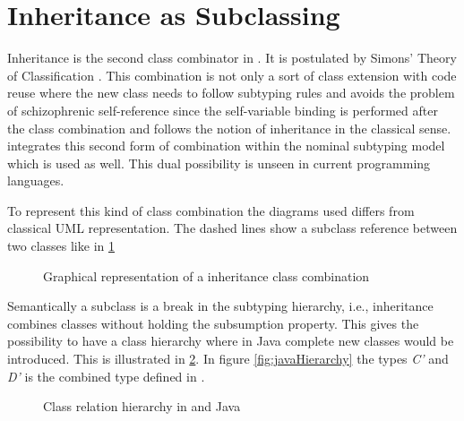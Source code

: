 \section{Inheritance as Subclassing}
Inheritance is the second class combinator in \ooplss. It is postulated
by Simons' Theory of Classification \cite{simons_theory_2004-2}.
This combination is not only a sort of class extension with code
reuse where the new class needs to follow subtyping rules and avoids
the problem of schizophrenic self-reference since the self-variable
binding is performed after the class combination and follows the notion
of inheritance in the classical sense. \ooplss integrates this second
form of combination within the nominal subtyping model which is used as
well. This dual possibility is unseen in current programming languages.

To represent this kind of class combination the diagrams used differs from classical
UML representation. The dashed lines show a subclass reference between two classes
like in \cref{fig:subclassCombination}

\begin{figure}
	\centering
	\caption{Graphical representation of a inheritance class combination}
	\label{fig:subclassCombination}
\end{figure}

Semantically a subclass is a break in the subtyping hierarchy, i.e., inheritance
combines classes without holding the subsumption property. This gives \ooplss
the possibility to have a class hierarchy where in Java complete new classes
would be introduced. This is illustrated in \cref{fig:inheritHierarchy}. In figure
\ref{fig:javaHierarchy} the types \emph{C'} and \emph{D'} is the combined type
defined in \ooplss.

\begin{figure}
	\centering
	\caption{Class relation hierarchy in \ooplss and Java}
	\label{fig:inheritHierarchy}
\end{figure}

